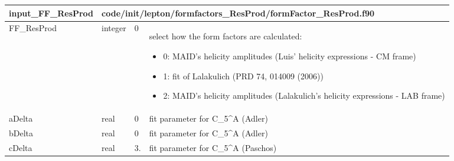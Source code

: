 \documentclass{article}
\begin{document}
\begin{longtable}{llll}
\toprule
\textbf{\large{input\_FF\_ResProd}} & \multicolumn{3}{l}{\footnotesize{code/init/lepton/formfactors\_ResProd/formFactor\_ResProd.f90}}\\*
\midrule
\endfirsthead
\midrule
\endhead
FF\_ResProd & \begin{minipage}[t]{2cm}integer\end{minipage} & \begin{minipage}[t]{2cm}0\end{minipage} & \begin{minipage}[t]{12cm}select how the form factors are calculated:\begin{itemize}\leftmargin0em\itemindent0pt\item 0: MAID's helicity amplitudes (Luis' helicity expressions - CM frame)\item 1: fit of Lalakulich (PRD 74, 014009 (2006))\item 2: MAID's helicity amplitudes (Lalakulich's helicity expressions - LAB frame)\end{itemize}\end{minipage}\\*
\midrule
aDelta & \begin{minipage}[t]{2cm}real\end{minipage} & \begin{minipage}[t]{2cm}0\end{minipage} & \begin{minipage}[t]{12cm}fit parameter for C\_5\^{}A (Adler)\end{minipage}\\*
\midrule
bDelta & \begin{minipage}[t]{2cm}real\end{minipage} & \begin{minipage}[t]{2cm}0\end{minipage} & \begin{minipage}[t]{12cm}fit parameter for C\_5\^{}A (Adler)\end{minipage}\\*
\midrule
cDelta & \begin{minipage}[t]{2cm}real\end{minipage} & \begin{minipage}[t]{2cm}3.\end{minipage} & \begin{minipage}[t]{12cm}fit parameter for C\_5\^{}A (Paschos)\end{minipage}\\*

\end{longtable}
\end{document}
